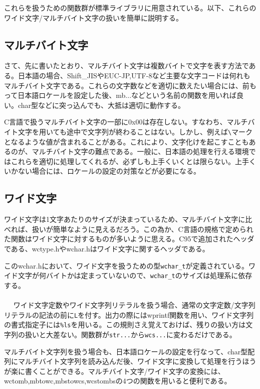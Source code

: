 これらを扱うための関数群が標準ライブラリに用意されている。以下、これらのワイド文字/マルチバイト文字の扱いを簡単に説明する。

\subsection{マルチバイト文字}
さて、先に書いたとおり、マルチバイト文字は複数バイトで文字を表す方法である。日本語の場合、Shift\_JISやEUC-JP,UTF-8など主要な文字コードは何れもマルチバイト文字である。これらの文字数などを適切に数えたい場合には、前もって日本語ロケールを設定した後、mb...などという名前の関数を用いれば良い。char型などに突っ込んでも、大抵は適切に動作する。

C言語で扱うマルチバイト文字の一部に0x00は存在しない。すなわち、マルチバイト文字を用いても途中で文字列が終わることはない。しかし、例えば\verb|\|マークとなるような値が含まれることがある。これにより、文字化けを起こすこともあるのが、マルチバイト文字の難点である。一般に、日本語の処理を行える環境ではこれらを適切に処理してくれるが、必ずしも上手くいくとは限らない。上手くいかない場合には、ロケールの設定の対策などが必要になる。

\subsection{ワイド文字}
ワイド文字は1文字あたりのサイズが決まっているため、マルチバイト文字に比べれば、扱いが簡単なように見えるだろう。この為か、C言語の規格で定められた関数はワイド文字に対するものが多いように思える。C95で追加されたヘッダである、wctype.hやwchar.hはワイド文字に関するヘッダである。

このwchar.hにおいて、ワイド文字を扱うための型\verb|wchar_t|が定義されている。ワイド文字が何バイトかは定まっていないので、\verb|wchar_t|のサイズは処理系に依存する。
\\ \\　
ワイド文字定数やワイド文字列リテラルを扱う場合、通常の文字定数/文字列リテラルの記法の前に\verb|L|を付す。出力の際にはwprintf関数を用い、ワイド文字列の書式指定子には\verb|%ls|を用いる。この規則さえ覚えておけば、残りの扱い方は文字列の扱いと大差ない。関数群が\verb|str...|から\verb|wcs...|に変わるだけである。

マルチバイト文字列を扱う場合も、日本語ロケールの設定を行なって、char型配列にマルチバイト文字列を読み込んだ後、ワイド文字に変換して処理を行うほうが楽に書くことができる。マルチバイト文字/ワイド文字の変換には、wctomb,mbtowc,mbstowcs,wcstombsの4つの関数を用いると便利である。

